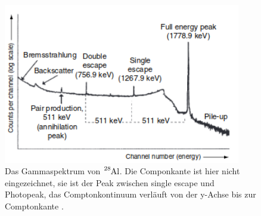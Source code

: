\begin{figure}
  \centering
  \includegraphics[height=7cm]{Spektrum.png}
  \caption{Das Gammaspektrum von $\ce{^{28}Al}$. Die Componkante ist hier nicht eingezeichnet, sie ist der Peak zwischen single escape und Photopeak,
  das Comptonkontinuum verläuft von der y-Achse bis zur Comptonkante \cite{Gilmore2}.}
  \label{fig:Spektrum}
\end{figure}
